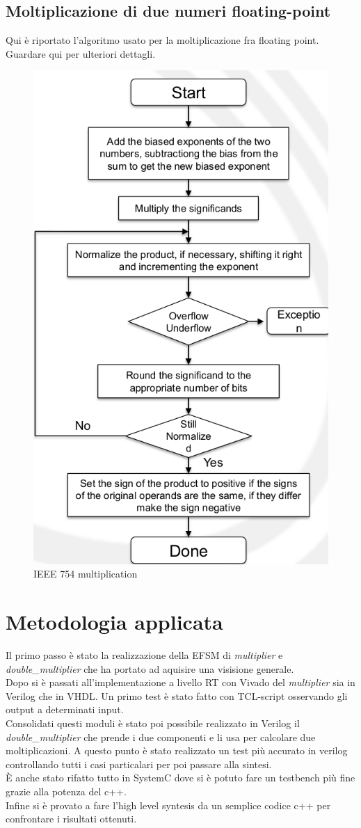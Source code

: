 \documentclass[]{IEEEtran}
\begin{document}
\subsection{Moltiplicazione di due numeri floating-point}
Qui è riportato l'algoritmo usato per la moltiplicazione fra floating point. Guardare qui per ulteriori dettagli\cite{IEEE754Mult}.
\begin{figure}[!htb]
    \centering
    \includegraphics[width=0.6\linewidth]{figures/ieee_multiplication.png}
    \caption{IEEE 754 multiplication}
    \label{fig:IEEE_multiplication}
\end{figure}



\section{Metodologia applicata}
Il primo passo è stato la realizzazione della EFSM di \textit{multiplier} e \textit{double\_multiplier} che ha portato ad aquisire una visisione generale.
\\Dopo si è passati all'implementazione a livello RT con Vivado\cite{Vivado} del \textit{multiplier} sia in Verilog che in VHDL. Un primo test è stato fatto con TCL-script osservando gli output a determinati input.
\\Consolidati questi moduli è stato poi possibile realizzato in Verilog il \textit{double\_multiplier} che prende i due componenti e li usa per calcolare due moltiplicazioni. A questo punto è stato realizzato un test più accurato in verilog controllando tutti i casi particalari per poi passare alla sintesi.
\\È anche stato rifatto tutto in SystemC dove si è potuto fare un testbench più fine grazie alla potenza del c++.
\\Infine si è provato a fare l'high level syntesis da un semplice codice c++ per confrontare i risultati ottenuti.
\end{document}
